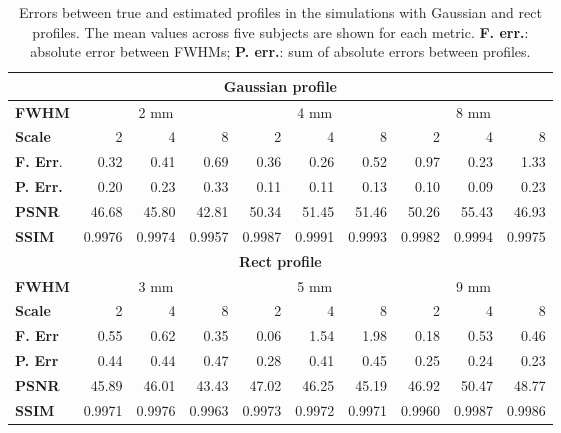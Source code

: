 \documentclass[runningheads]{llncs}
\begin{document}
\begin{table}[t]
\setlength{\tabcolsep}{3.5pt}
\centering
%
\caption{Errors between true and estimated profiles in the simulations
with Gaussian and rect profiles. The mean values across five subjects
are shown for each metric. \textbf{F. err.}: absolute error between
FWHMs; \textbf{P. err.}: sum of absolute errors between profiles.}
%
\begin{tabular}{lrrrrrrrrr}
%
\toprule
\multicolumn{10}{c}{\textbf{Gaussian profile}}\\
\midrule
\textbf{FWHM} & \multicolumn{3}{c}{2 mm} & \multicolumn{3}{c}{4 mm}
 & \multicolumn{3}{c}{8 mm} \\
\cmidrule{1-1}
\cmidrule(l){2-4}
\cmidrule(l){5-7}
\cmidrule(l){8-10}
\textbf{Scale} &       2 &       4 &       8 &       2 &       4 &       8 &       2 &       4 &       8 \\
\midrule
\textbf{F. Err}. &    0.32 &    0.41 &    0.69 &    0.36 &    0.26 &    0.52 &    0.97 &    0.23 &    1.33 \\
\textbf{P. Err.} &    0.20 &    0.23 &    0.33 &    0.11 &    0.11 &    0.13 &    0.10 &    0.09 &    0.23 \\
\textbf{PSNR}    &   46.68 &   45.80 &   42.81 &   50.34 &   51.45 &   51.46 &   50.26 &   55.43 &   46.93 \\
\textbf{SSIM}    &  0.9976 &  0.9974 &  0.9957 &  0.9987 &  0.9991 &  0.9993 &  0.9982 &  0.9994 &  0.9975 \\

\midrule
\multicolumn{10}{c}{\textbf{Rect profile}}\\
\midrule

\textbf{FWHM} & \multicolumn{3}{c}{3 mm} & \multicolumn{3}{c}{5 mm}
 & \multicolumn{3}{c}{9 mm} \\
\cmidrule{1-1}
\cmidrule(l){2-4}
\cmidrule(l){5-7}
\cmidrule(l){8-10}
\textbf{Scale} & 2 & 4 & 8 & 2 & 4 & 8 & 2 & 4 & 8 \\
\midrule

\textbf{F. Err} &    0.55 &    0.62 &    0.35 &    0.06 &    1.54 &    1.98 &    0.18 &    0.53 &    0.46 \\
\textbf{P. Err} &    0.44 &    0.44 &    0.47 &    0.28 &    0.41 &    0.45 &    0.25 &    0.24 &    0.23 \\
\textbf{PSNR}   &   45.89 &   46.01 &   43.43 &   47.02 &   46.25 &   45.19 &   46.92 &   50.47 &   48.77 \\
\textbf{SSIM}    &  0.9971 &  0.9976 &  0.9963 &  0.9973 &  0.9972 &  0.9971 &  0.9960 &  0.9987 &  0.9986 \\
\bottomrule

\end{tabular}
\label{tab:simu}
\end{table}
\end{document}
